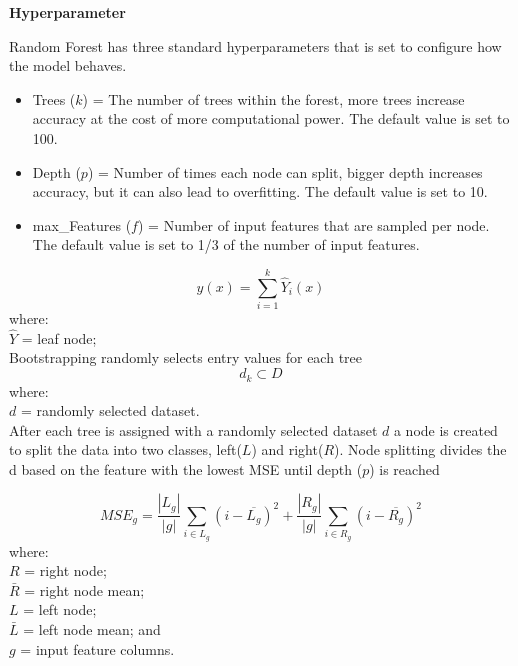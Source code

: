\vspace{12pt}
\textbf{Hyperparameter}

Random Forest has three standard hyperparameters that is set to configure how the model behaves.

\begin{itemize}
	\item[] Trees ($k$) = The number of trees within the forest, more trees increase accuracy at the cost of more computational power. The default value is set to 100.
	\item[] Depth ($p$) = Number of times each node can split, bigger depth increases accuracy, but it can also lead to overfitting. The default value is set to 10.
	\item[] max\_Features ($f$) = Number of input features that are sampled per node. The default value is set to 1/3 of the number of input features.
\end{itemize}

\begin{equation}
	y(x) = \sum_{i=1}^{k} \hat{Y}_i(x)
	\label{eq:rfr_equation}
\end{equation}
\noindent where: \\[2pt]
$\hat{Y}$ = leaf node; \\[12pt]

Bootstrapping randomly selects entry values for each tree \\[12pt]

\begin{equation}
	d_k \subset D
	\label{eq:bootstrapping}
\end{equation}
\noindent where: \\[2pt]
$d$ = randomly selected dataset. \\

After each tree is assigned with a randomly selected dataset $d$ a node is created to split the data into two classes, left($L$) and right($R$). Node splitting divides the d based on the feature with the lowest MSE until depth ($p$) is reached

\begin{equation}
	MSE_g = \frac{|L_g|}{|g|} \sum_{i \in L_g} (i - \overline{L_g})^2 + \frac{|R_g|}{|g|} \sum_{i \in R_g} (i - \overline{R_g})^2
	\label{eq:mse_g}
\end{equation}
\noindent where: \\[2pt]
$R$ = right node; \\
$\bar{R}$ = right node mean; \\
$L$ = left node; \\
$\bar{L}$ = left node mean; and \\
$g$ = input feature columns. \\

